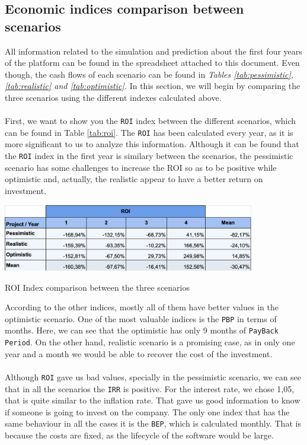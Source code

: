 \documentclass[./main.tex]{subfiles}
\begin{document}
\subsection{Economic indices comparison between scenarios}
All information related to the simulation and prediction about the first four years of the platform can be found in the spreadsheet attached to this document. Even though, the cash flows of each scenario can be found in \textit{Tables \ref{tab:pessimistic}, \ref{tab:realistic} and \ref{tab:optimistic}.}
In this section, we will begin by comparing the three scenarios using the different indexes calculated above. \\
\\
First, we want to show you the \texttt{ROI} index between the different scenarios, which can be found in Table \ref{tab:roi}. The \texttt{ROI} has been calculated every year, as it is more significant to us to analyze this information. Although it can be found that the \texttt{ROI} index in the first year is similary between the scenarios, the pessimistic scenario has some challenges to increase the ROI so as to be positive while optimistic and, actually, the realistic appear to have a better return on investment.
\begin{table}[H]
	\centering
	\includegraphics[width=11cm]{roi2.png}
	\caption{ROI Index comparison between the three scenarios}
	\label{tab:roi}
\end{table}
According to the other indices, mostly all of them have better values in the optimistic scenario. One of the most valuable indices is the \texttt{PBP} in terms of months. Here, we can see that the optimistic has only 9 months of \texttt{PayBack Period}. On the other hand, realistic scenario is a promising case, as in only one year and a month we would be able to recover the cost of the investment.
\\
\\
Although \texttt{ROI} gave us bad values, specially in the pessimistic scenario, we can see that in all the scenarios the \texttt{IRR} is positive. For the interest rate, we chose 1,05, that is quite similar to the inflation rate. That gave us good information to know if someone is going to invest on the company. The only one index that has the same behaviour in all the cases it is the \texttt{BEP}, which is calculated monthly. That is because the costs are fixed, as the lifecycle of the software would be large.
\end{document}
